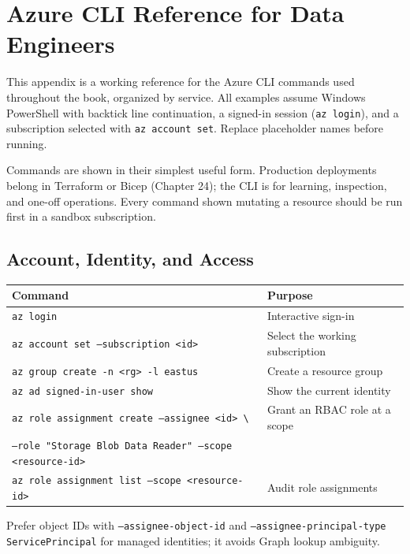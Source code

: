 \chapter{Azure CLI Reference for Data Engineers}
%
This appendix is a working reference for the Azure CLI commands used throughout the
book, organized by service. All examples assume Windows PowerShell with backtick
line continuation, a signed-in session (\texttt{az login}), and a subscription
selected with \texttt{az account set}. Replace placeholder names before running.

\begin{notebox}
Commands are shown in their simplest useful form. Production deployments belong in
Terraform or Bicep (Chapter 24); the CLI is for learning, inspection, and one-off
operations. Every command shown mutating a resource should be run first in a
sandbox subscription.
\end{notebox}

\section{Account, Identity, and Access}

\begin{center}
\footnotesize
\begin{tabular}{@{}p{6.6cm}p{6.8cm}@{}}
\toprule
\textbf{Command} & \textbf{Purpose} \\
\midrule
\texttt{az login} & Interactive sign-in \\
\texttt{az account set --subscription <id>} & Select the working subscription \\
\texttt{az group create -n <rg> -l eastus} & Create a resource group \\
\texttt{az ad signed-in-user show} & Show the current identity \\
\texttt{az role assignment create --assignee <id> \textbackslash} & Grant an RBAC role at a scope \\
\quad \texttt{--role "Storage Blob Data Reader" --scope <resource-id>} & \\
\texttt{az role assignment list --scope <resource-id>} & Audit role assignments \\
\bottomrule
\end{tabular}
\end{center}

Prefer object IDs with \texttt{--assignee-object-id} and
\texttt{--assignee-principal-type ServicePrincipal} for managed identities; it
avoids Graph lookup ambiguity.

